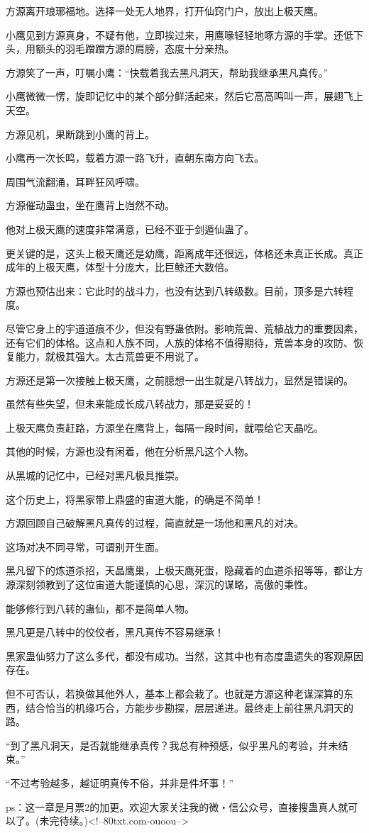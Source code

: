 \begin{this_body}
方源离开琅琊福地。选择一处无人地界，打开仙窍门户，放出上极天鹰。

小鹰见到方源真身，不疑有他，立即挨过来，用鹰喙轻轻地啄方源的手掌。还低下头，用额头的羽毛蹭蹭方源的肩膀，态度十分亲热。

方源笑了一声，叮嘱小鹰：“快载着我去黑凡洞天，帮助我继承黑凡真传。”

小鹰微微一愣，旋即记忆中的某个部分鲜活起来，然后它高高鸣叫一声，展翅飞上天空。

方源见机，果断跳到小鹰的背上。

小鹰再一次长鸣，载着方源一路飞升，直朝东南方向飞去。

周围气流翻涌，耳畔狂风呼啸。

方源催动蛊虫，坐在鹰背上岿然不动。

他对上极天鹰的速度非常满意，已经不亚于剑遁仙蛊了。

更关键的是，这头上极天鹰还是幼鹰，距离成年还很远，体格还未真正长成。真正成年的上极天鹰，体型十分庞大，比巨鲸还大数倍。

方源也预估出来：它此时的战斗力，也没有达到八转级数。目前，顶多是六转程度。

尽管它身上的宇道道痕不少，但没有野蛊依附。影响荒兽、荒植战力的重要因素，还有它们的体格。这点和人族不同，人族的体格不值得期待，荒兽本身的攻防、恢复能力，就极其强大。太古荒兽更不用说了。

方源还是第一次接触上极天鹰，之前臆想一出生就是八转战力，显然是错误的。

虽然有些失望，但未来能成长成八转战力，那是妥妥的！

上极天鹰负责赶路，方源坐在鹰背上，每隔一段时间，就喂给它天晶吃。

其他的时候，方源也没有闲着，他在分析黑凡这个人物。

从黑城的记忆中，已经对黑凡极具推崇。

这个历史上，将黑家带上鼎盛的宙道大能，的确是不简单！

方源回顾自己破解黑凡真传的过程，简直就是一场他和黑凡的对决。

这场对决不同寻常，可谓别开生面。

黑凡留下的炼道杀招，天晶鹰巢，上极天鹰死蛋，隐藏着的血道杀招等等，都让方源深刻领教到了这位宙道大能谨慎的心思，深沉的谋略，高傲的秉性。

能够修行到八转的蛊仙，都不是简单人物。

黑凡更是八转中的佼佼者，黑凡真传不容易继承！

黑家蛊仙努力了这么多代，都没有成功。当然，这其中也有态度蛊遗失的客观原因存在。

但不可否认，若换做其他外人，基本上都会栽了。也就是方源这种老谋深算的东西，结合恰当的机缘巧合，方能步步勘探，层层递进。最终走上前往黑凡洞天的路。

“到了黑凡洞天，是否就能继承真传？我总有种预感，似乎黑凡的考验，并未结束。”

“不过考验越多，越证明真传不俗，并非是件坏事！”

ps：这一章是月票2的加更。欢迎大家关注我的微・信公众号，直接搜蛊真人就可以了。(未完待续。)<!--80txt.com-ouoou-->

\end{this_body}

